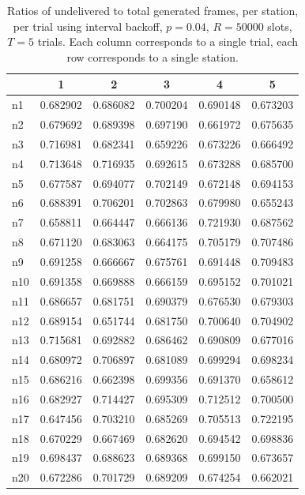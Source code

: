 \documentclass[twocolumn]{article}
\begin{document}
\begin{table}
    \centering 
    \label{fig:fairness_ib}
    \begin{tabular}{l|c|c|c|c|c}
           & 1 & 2 & 3 & 4 & 5 \\
        \hline

        n1 & 0.682902 & 0.686082 & 0.700204 & 0.690148 & 0.673203 \\
        n2 & 0.679692 & 0.689398 & 0.697190 & 0.661972 & 0.675635 \\
        n3 & 0.716981 & 0.682341 & 0.659226 & 0.673226 & 0.666492 \\
        n4 & 0.713648 & 0.716935 & 0.692615 & 0.673288 & 0.685700 \\
        n5 & 0.677587 & 0.694077 & 0.702149 & 0.672148 & 0.694153 \\
        n6 & 0.688391 & 0.706201 & 0.702863 & 0.679980 & 0.655243 \\
        n7 & 0.658811 & 0.664447 & 0.666136 & 0.721930 & 0.687562 \\
        n8 & 0.671120 & 0.683063 & 0.664175 & 0.705179 & 0.707486 \\
        n9 & 0.691258 & 0.666667 & 0.675761 & 0.691448 & 0.709483 \\
       n10 & 0.691358 & 0.669888 & 0.666159 & 0.695152 & 0.701021 \\
       n11 & 0.686657 & 0.681751 & 0.690379 & 0.676530 & 0.679303 \\
       n12 & 0.689154 & 0.651744 & 0.681750 & 0.700640 & 0.704902 \\
       n13 & 0.715681 & 0.692882 & 0.686462 & 0.690809 & 0.677016 \\
       n14 & 0.680972 & 0.706897 & 0.681089 & 0.699294 & 0.698234 \\
       n15 & 0.686216 & 0.662398 & 0.699356 & 0.691370 & 0.658612 \\
       n16 & 0.682927 & 0.714427 & 0.695309 & 0.712512 & 0.700500 \\
       n17 & 0.647456 & 0.703210 & 0.685269 & 0.705513 & 0.722195 \\
       n18 & 0.670229 & 0.667469 & 0.682620 & 0.694542 & 0.698836 \\
       n19 & 0.698437 & 0.688623 & 0.689368 & 0.699150 & 0.673657 \\
       n20 & 0.672286 & 0.701729 & 0.689209 & 0.674254 & 0.662021


    \end{tabular}
    \caption{ Ratios of undelivered to total generated frames, per station, per trial using
        interval backoff, $p=0.04$, $R=50000$ slots, $T = 5$ trials.  
        Each column corresponds to a single trial, each row corresponds to a single station. }

\end{table}
\end{document}
